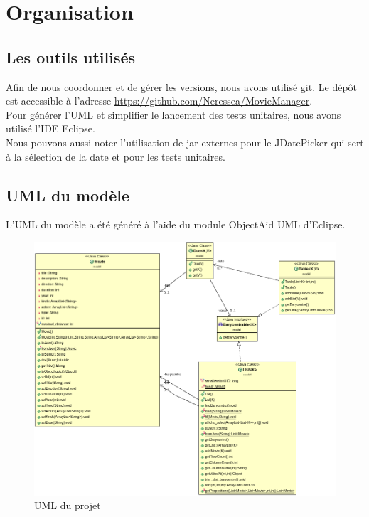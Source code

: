 \section{Organisation}
\subsection{Les outils utilisés}

Afin de nous coordonner et de gérer les versions, nous avons utilisé git. Le dépôt est accessible à l'adresse \url{https://github.com/Neressea/MovieManager}. \\
Pour générer l'UML et simplifier le lancement des tests unitaires, nous avons utilisé l'IDE Eclipse. \\
Nous pouvons aussi noter l'utilisation de jar externes pour le JDatePicker qui sert à la sélection de la date et pour les tests unitaires.

\subsection{UML du modèle}

L'UML du modèle a été généré à l'aide du module ObjectAid UML d'Eclipse. \\

\begin{figure}[!ht]
    \includegraphics[width=1\textwidth]{./images/uml.png}
    \caption{UML du projet}
\end{figure}

